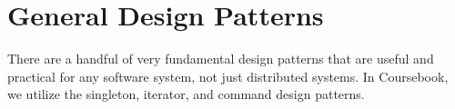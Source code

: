 \section{General Design Patterns}

There are a handful of very fundamental design patterns that are useful and
practical for any software system, not just distributed systems. In Coursebook,
we utilize the singleton, iterator, and command design patterns.




